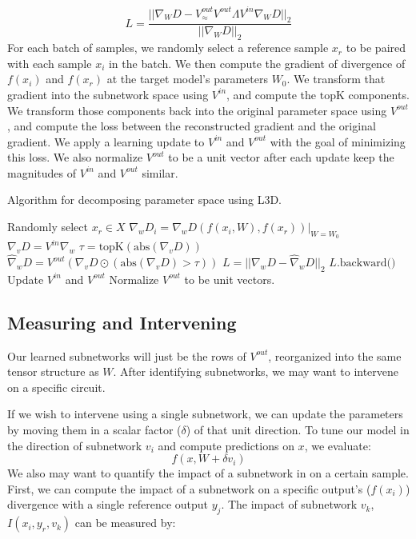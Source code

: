 \documentclass{article}
\theoremstyle{plain}
\theoremstyle{definition}
\theoremstyle{remark}
\begin{document}
\begin{equation}
    L = \frac{{|| \nabla_W D - V^{out}_\approx V^{out} \Lambda V^{in} \nabla_W D  ||}_2}{{|| \nabla_W D ||}_2}
\end{equation}
For each batch of samples, we randomly select a reference sample $x_r$ to be paired with each sample $x_i$ in the batch. We then compute the gradient of divergence of $f(x_i)$ and $f(x_r)$ at the target model's parameters $W_0$. We transform that gradient into the subnetwork space using $V^{in}$, and compute the $\text{topK}$ components. We transform those components back into the original parameter space using $V^{out}$, and compute the loss between the reconstructed gradient and the original gradient. We apply a learning update to $V^{in}$ and $V^{out}$ with the goal of minimizing this loss. We also normalize $V^{out}$ to be a unit vector after each update keep the magnitudes of $V^{in}$ and $V^{out}$ similar.


\begin{algorithm}\label{alg:training}
\caption{Algorithm for decomposing parameter space using L3D.}
\begin{algorithmic}[1]
            \STATE Randomly select $x_r \in X$
            \STATE $\nabla_w D_i = \nabla_w D(f(x_i, W), f(x_r))|_{W=W_0}$
        \ENDFOR
        \STATE $\nabla_v D = {V^{in}} \nabla_w$
        \STATE $\tau = \text{topK}(\text{abs}(\nabla_v D))$
        \STATE $\hat{\nabla}_w D = {V^{out}} (\nabla_v D \odot (\text{abs}(\nabla_v D) > \tau))$
        \STATE $L = {|| \nabla_w D - \hat{\nabla}_w D ||}_2$
        \STATE $L.\text{backward()}$
        \STATE Update $V^{in}$ and $V^{out}$
        \STATE Normalize $V^{out}$ to be unit vectors.
    \ENDFOR
\ENDFOR
\end{algorithmic}
\end{algorithm}

\subsection{Measuring and Intervening}\label{subsec:intervention}

Our learned subnetworks will just be the rows of $V^{out}$, reorganized into the same tensor structure as $W$. After identifying subnetworks, we may want to intervene on a specific circuit.

If we wish to intervene using a single subnetwork, we can update the parameters by moving them in a scalar factor ($\delta$) of that unit direction. To tune our model in the direction of subnetwork $v_i$ and compute predictions on $x$, we evaluate:
\begin{equation}
    f(x, W + \delta v_i)
\end{equation}
We also may want to quantify the impact of a subnetwork in on a certain sample. First, we can compute the impact of a subnetwork on a specific output's ($f(x_i)$) divergence with a single reference output $y_j$. The impact of subnetwork $v_k$, $I(x_i, y_r, v_k)$ can be measured by:
\end{document}
